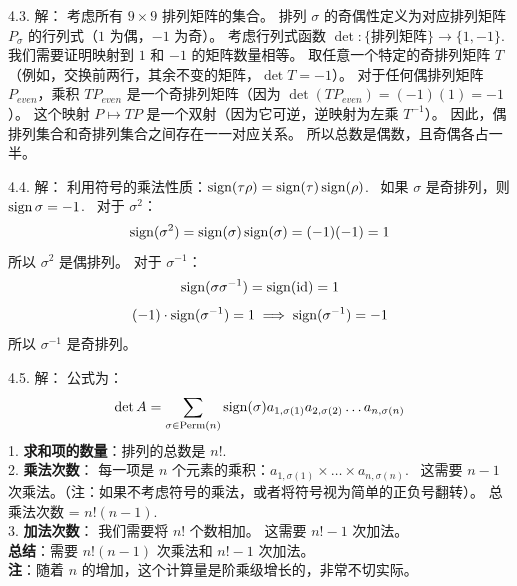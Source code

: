 \begin{exer}
4.3. 解：
考虑所有 $9 \times 9$ 排列矩阵的集合。
排列 $\sigma$ 的奇偶性定义为对应排列矩阵 $P_\sigma$ 的行列式（$1$ 为偶，$-1$ 为奇）。
考虑行列式函数 $\det: \{ \text{排列矩阵} \} \to \{1, -1\}$.~
我们需要证明映射到 $1$ 和 $-1$ 的矩阵数量相等。
取任意一个特定的奇排列矩阵 $T$（例如，交换前两行，其余不变的矩阵，$\det T = -1$）。
对于任何偶排列矩阵 $P_{even}$，乘积 $T P_{even}$ 是一个奇排列矩阵（因为 $\det(T P_{even}) = (-1)(1) = -1$）。
这个映射 $P \mapsto TP$ 是一个双射（因为它可逆，逆映射为左乘 $T^{-1}$）。
因此，偶排列集合和奇排列集合之间存在一一对应关系。
所以总数是偶数，且奇偶各占一半。

4.4. 解：
利用符号的乘法性质：$\operatorname{sign}(\tau \rho) = \operatorname{sign}(\tau)\operatorname{sign}(\rho)$.~
如果 $\sigma$ 是奇排列，则 $\operatorname{sign} \sigma = -1$.~
对于 $\sigma^2$：
$$ \operatorname{sign}(\sigma^2) = \operatorname{sign}(\sigma) \operatorname{sign}(\sigma) = (-1)(-1) = 1 $$
所以 $\sigma^2$ 是偶排列。
对于 $\sigma^{-1}$：
$$ \operatorname{sign}(\sigma \sigma^{-1}) = \operatorname{sign}(\text{id}) = 1 $$
$$ (-1) \cdot \operatorname{sign}(\sigma^{-1}) = 1 \implies \operatorname{sign}(\sigma^{-1}) = -1 $$
所以 $\sigma^{-1}$ 是奇排列。

4.5. 解：
公式为：
$$ \det A = \sum_{\sigma \in \text{Perm}(n)} \operatorname{sign}(\sigma) a_{1, \sigma(1)} a_{2, \sigma(2)} \dots a_{n, \sigma(n)} $$
1.  \textbf{求和项的数量}：排列的总数是 $n!$.~\\
2.  \textbf{乘法次数}：
    每一项是 $n$ 个元素的乘积：$a_{1, \sigma(1)} \times \dots \times a_{n, \sigma(n)}$.~
    这需要 $n-1$ 次乘法。（注：如果不考虑符号的乘法，或者将符号视为简单的正负号翻转）。
    总乘法次数 = $n! (n-1)$.~\\
3.  \textbf{加法次数}：
    我们需要将 $n!$ 个数相加。
    这需要 $n! - 1$ 次加法。\\
\textbf{总结}：需要 $n!(n-1)$ 次乘法和 $n! - 1$ 次加法。\\
\textbf{注}：随着 $n$ 的增加，这个计算量是阶乘级增长的，非常不切实际。

\vspace{5ex}



\end{exer}
